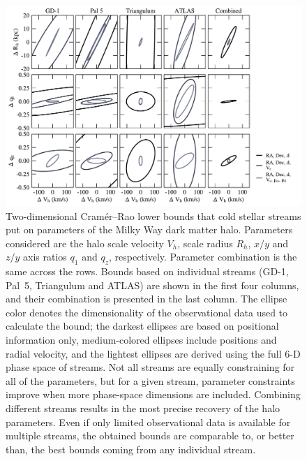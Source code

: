 \documentclass[modern]{aastex61}
\begin{document}
\begin{figure}
\begin{center}
\includegraphics[width=\textwidth]{crlb_2d.pdf}
\caption{Two-dimensional Cram\' er--Rao lower bounds that cold stellar streams put on parameters of the Milky Way dark matter halo.
Parameters considered are the halo scale velocity $V_h$, scale radius $R_h$, $x/y$ and $z/y$ axis ratios $q_1$ and $q_z$, respectively.
Parameter combination is the same across the rows.
Bounds based on individual streams (GD-1, Pal~5, Triangulum and ATLAS) are shown in the first four columns, and their combination is presented in the last column.
The ellipse color denotes the dimensionality of the observational data used to calculate the bound; the darkest ellipses are based on positional information only, medium-colored ellipses include positions and radial velocity, and the lightest ellipses are derived using the full 6-D phase space of streams.
Not all streams are equally constraining for all of the parameters, but for a given stream, parameter constraints improve when more phase-space dimensions are included.
Combining different streams results in the most precise recovery of the halo parameters.
Even if only limited observational data is available for multiple streams, the obtained bounds are comparable to, or better than, the best bounds coming from any individual stream.
}
\label{fig:2dbounds}
\end{center}
\end{figure}
\end{document}
